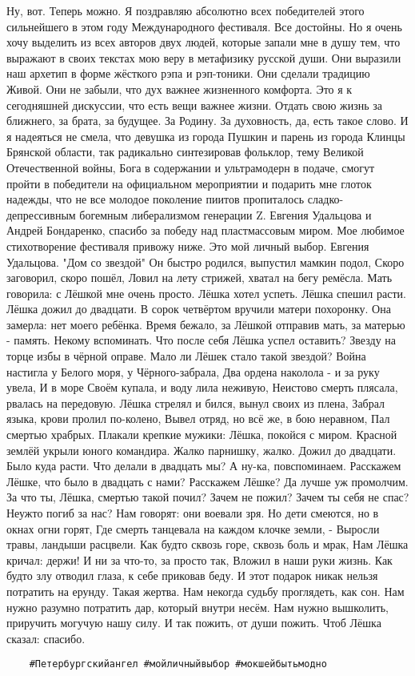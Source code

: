 Ну, вот. Теперь можно. Я поздравляю абсолютно всех победителей этого сильнейшего в этом году Международного фестиваля. Все достойны. Но я очень хочу выделить из всех авторов двух людей, которые запали мне в душу тем, что выражают в своих текстах мою веру в метафизику русской души. Они выразили наш архетип в форме жёсткого рэпа и рэп-тоники. Они сделали традицию Живой. Они не забыли, что дух важнее жизненного комфорта. 
Это я к сегодняшней дискуссии, что есть вещи важнее жизни. Отдать свою жизнь за ближнего, за брата, за будущее. За Родину. За духовность, да, есть такое слово.
И я надеяться не смела, что девушка из города Пушкин и парень из города Клинцы Брянской области, так радикально синтезировав фольклор, тему Великой Отечественной войны, Бога в содержании и ультрамодерн в подаче, смогут пройти в победители на официальном мероприятии и подарить мне глоток надежды, что не все молодое поколение пиитов пропиталось сладко-депрессивным богемным либерализмом генерации Z. 
Евгения Удальцова и Андрей Бондаренко, спасибо за победу над пластмассовым миром. 
Мое любимое стихотворение фестиваля привожу ниже. Это мой личный выбор.
Евгения Удальцова. "Дом со звездой"
Он быстро родился, выпустил мамкин подол, 
Скоро заговорил, скоро пошёл, 
Ловил на лету стрижей, хватал на бегу ремёсла. 
Мать говорила: с Лёшкой мне очень просто. 
Лёшка хотел успеть. Лёшка спешил расти. 
Лёшка дожил до двадцати. 
В сорок четвёртом вручили матери похоронку. 
Она замерла: нет моего ребёнка. 
Время бежало, за Лёшкой отправив мать, 
за матерью - память. Некому вспоминать. 
Что после себя Лёшка успел оставить? 
Звезду на торце избы в чёрной оправе. 
Мало ли Лёшек стало такой звездой? 
Война настигла у Белого моря, у Чёрного-забрала, 
Два ордена наколола - и за руку увела, 
И в море Своём купала, и воду лила неживую, 
Неистово смерть плясала, рвалась на передовую. 
Лёшка стрелял и бился, вынул своих из плена, 
Забрал языка, крови пролил по-колено, 
Вывел отряд, но всё же, в бою неравном, 
Пал смертью храбрых. 
Плакали крепкие мужики: Лёшка, покойся с миром. 
Красной землёй укрыли юного командира. 
Жалко парнишку, жалко. 
Дожил до двадцати. 
Было куда расти. 
Что делали в двадцать мы? А ну-ка, повспоминаем. 
Расскажем Лёшке, что было в двадцать с нами? 
Расскажем Лёшке? Да лучше уж промолчим. 
За что ты, Лёшка, смертью такой почил? 
Зачем не пожил? Зачем ты себя не спас? 
Неужто погиб за нас? 
Нам говорят: они воевали зря. 
Но дети смеются, но в окнах огни горят, 
Где смерть танцевала на каждом клочке земли, - 
Выросли травы, ландыши расцвели. 
Как будто сквозь горе, сквозь боль и мрак, 
Нам Лёшка кричал: держи! 
И ни за что-то, за просто так, 
Вложил в наши руки жизнь. 
Как будто злу отводил глаза, к себе приковав беду. 
И этот подарок никак нельзя потратить на ерунду. 
Такая жертва. Нам некогда судьбу проглядеть, как сон. 
Нам нужно разумно потратить дар, который внутри несём. 
Нам нужно вышколить, приручить могучую нашу силу. 
И так пожить, от души пожить. 
Чтоб Лёшка сказал: спасибо.

\begin{verbatim}
	#Петербургскийангел #мойличныйвыбор #мокшейбытьмодно
\end{verbatim}
